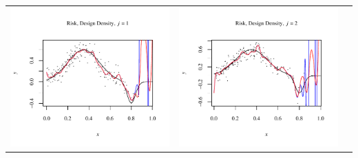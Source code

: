 \documentclass[11pt]{article}
\begin{document}
\begin{table}[h!]
  \begin{center}
    \renewcommand{\arraystretch}{1.5}
    \begin{tabular}{| >{\centering\arraybackslash}m{2.1in} |  >{\centering\arraybackslash}m{2.1in} |  >{\centering\arraybackslash}m{2.1in}|}
      \hline
      \includegraphics[width=1\linewidth,height=0.18\textheight]{Graphs/4/2/assignment5_a_4_2_1}&
      \includegraphics[width=1\linewidth,height=0.18\textheight]{Graphs/4/2/assignment5_a_4_2_2}&

\end{tabular}
\end{center}
\end{table}
\end{document}
